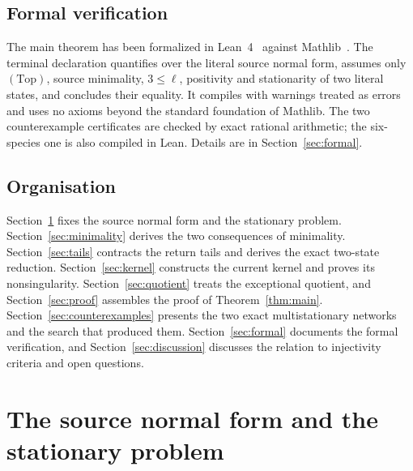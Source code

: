 \documentclass[11pt,reqno]{amsart}
\theoremstyle{plain}
\theoremstyle{definition}
\theoremstyle{remark}
\numberwithin{equation}{section}
\newcommand{\Top}{\mathrm{(Top)}}
\begin{document}
\subsection*{Formal verification}
The main theorem has been formalized in Lean~4~\cite{dMU21} against Mathlib~\cite{mathlib20}.  The terminal declaration quantifies over the literal source normal form, assumes only $\Top$, source minimality, $3\le\ell$, positivity and stationarity of two literal states, and concludes their equality.  It compiles with warnings treated as errors and uses no axioms beyond the standard foundation of Mathlib.  The two counterexample certificates are checked by exact rational arithmetic; the six-species one is also compiled in Lean.  Details are in Section~\ref{sec:formal}.

\subsection*{Organisation}
Section~\ref{sec:normal-form} fixes the source normal form and the stationary problem.  Section~\ref{sec:minimality} derives the two consequences of minimality.  Section~\ref{sec:tails} contracts the return tails and derives the exact two-state reduction.  Section~\ref{sec:kernel} constructs the current kernel and proves its nonsingularity.  Section~\ref{sec:quotient} treats the exceptional quotient, and Section~\ref{sec:proof} assembles the proof of Theorem~\ref{thm:main}.  Section~\ref{sec:counterexamples} presents the two exact multistationary networks and the search that produced them.  Section~\ref{sec:formal} documents the formal verification, and Section~\ref{sec:discussion} discusses the relation to injectivity criteria and open questions.

\section{The source normal form and the stationary problem}\label{sec:normal-form}
\end{document}
